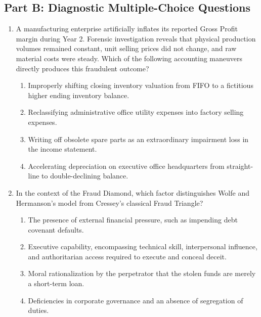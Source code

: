 \subsection*{Part B: Diagnostic Multiple-Choice Questions}

\begin{enumerate}[label=\textbf{MCQ 2.\arabic*}]
    \item A manufacturing enterprise artificially inflates its reported Gross Profit margin during Year 2. Forensic investigation reveals that physical production volumes remained constant, unit selling prices did not change, and raw material costs were steady. Which of the following accounting maneuvers directly produces this fraudulent outcome?
    \begin{enumerate}[label=(\alph*)]
        \item Improperly shifting closing inventory valuation from FIFO to a fictitious higher ending inventory balance.
        \item Reclassifying administrative office utility expenses into factory selling expenses.
        \item Writing off obsolete spare parts as an extraordinary impairment loss in the income statement.
        \item Accelerating depreciation on executive office headquarters from straight-line to double-declining balance.
    \end{enumerate}

    \item In the context of the Fraud Diamond, which factor distinguishes Wolfe and Hermanson's model from Cressey's classical Fraud Triangle?
    \begin{enumerate}[label=(\alph*)]
        \item The presence of external financial pressure, such as impending debt covenant defaults.
        \item Executive capability, encompassing technical skill, interpersonal influence, and authoritarian access required to execute and conceal deceit.
        \item Moral rationalization by the perpetrator that the stolen funds are merely a short-term loan.
        \item Deficiencies in corporate governance and an absence of segregation of duties.
    \end{enumerate}
\end{enumerate}
